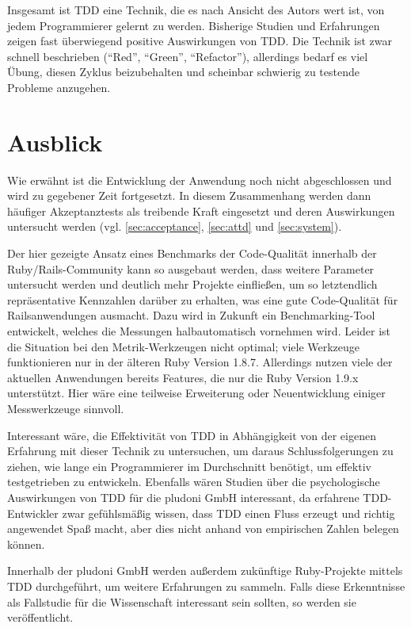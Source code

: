 Insgesamt ist TDD eine Technik, die es nach Ansicht des Autors wert ist, von jedem Programmierer gelernt zu werden. Bisherige Studien und Erfahrungen zeigen fast überwiegend positive Auswirkungen von TDD. Die Technik ist zwar schnell beschrieben ("`Red"', "`Green"', "`Refactor"'), allerdings bedarf es viel Übung, diesen Zyklus beizubehalten und scheinbar schwierig zu testende Probleme anzugehen.

\section{Ausblick}
Wie erwähnt ist die Entwicklung der Anwendung noch nicht abgeschlossen und wird zu gegebener Zeit fortgesetzt. In diesem Zusammenhang werden dann häufiger Akzeptanztests als treibende Kraft eingesetzt und deren Auswirkungen untersucht werden (vgl. \ref{sec:acceptance}, \ref{sec:attd} und \ref{sec:system}).

Der hier gezeigte Ansatz eines Benchmarks der Code-Qualität innerhalb der Ruby/Rails\hyp{}Community kann so ausgebaut werden, dass weitere Parameter untersucht werden und deutlich mehr Projekte einfließen, um so letztendlich repräsentative Kennzahlen darüber zu erhalten, was eine gute Code-Qualität für Railsanwendungen ausmacht. Dazu wird in Zukunft ein Benchmarking\hyp{}Tool entwickelt, welches die Messungen halbautomatisch vornehmen wird. Leider ist die Situation bei den Metrik-Werkzeugen nicht optimal; viele Werkzeuge funktionieren nur in der älteren Ruby Version 1.8.7. Allerdings nutzen viele der aktuellen Anwendungen bereits Features, die nur die Ruby Version 1.9.x unterstützt. Hier wäre eine teilweise Erweiterung oder Neuentwicklung einiger Messwerkzeuge sinnvoll.

Interessant wäre, die Effektivität von TDD in Abhängigkeit von der eigenen Erfahrung mit dieser Technik zu untersuchen, um daraus Schlussfolgerungen zu ziehen, wie lange ein Programmierer im Durchschnitt benötigt, um effektiv testgetrieben zu entwickeln. Ebenfalls wären Studien über die psychologische Auswirkungen von TDD für die pludoni GmbH interessant, da erfahrene TDD-Entwickler zwar gefühlsmäßig wissen, dass TDD einen Fluss erzeugt und richtig angewendet Spaß macht, aber dies nicht anhand von empirischen Zahlen belegen können.

Innerhalb der pludoni GmbH werden außerdem zukünftige Ruby-Projekte mittels TDD durchgeführt, um weitere Erfahrungen zu sammeln. Falls diese Erkenntnisse als Fallstudie für die Wissenschaft interessant sein sollten, so werden sie veröffentlicht.

